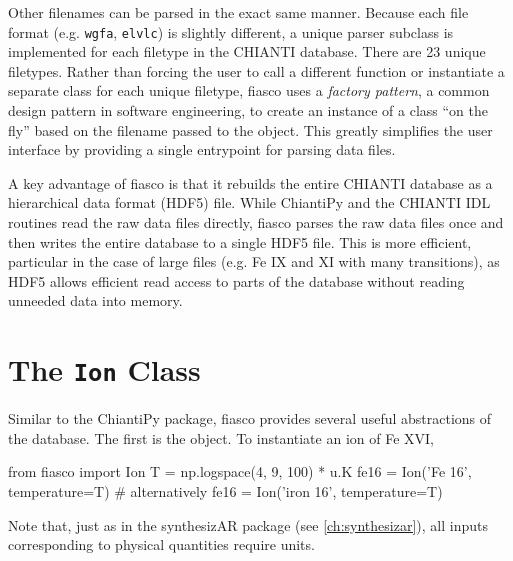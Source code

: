 Other filenames can be parsed in the exact same manner. Because each file format (e.g. \texttt{wgfa}, \texttt{elvlc}) is slightly different, a unique parser subclass is implemented for each filetype in the CHIANTI database. There are 23 unique filetypes. Rather than forcing the user to call a different function or instantiate a separate class for each unique filetype, fiasco uses a \textit{factory pattern}, a common design pattern in software engineering, to create an instance of a class ``on the fly'' based on the filename passed to the  object. This greatly simplifies the user interface by providing a single entrypoint for parsing data files.

A key advantage of fiasco is that it rebuilds the entire CHIANTI database as a hierarchical data format (HDF5) file. While ChiantiPy and the CHIANTI IDL routines read the raw data files directly, fiasco parses the raw data files once and then writes the entire database to a single HDF5 file. This is more efficient, particular in the case of large files (e.g. Fe IX and XI with many transitions), as HDF5 allows efficient read access to parts of the database without reading unneeded data into memory. 

\section{The \texttt{Ion} Class}\label{sec:fiasco-ion}

Similar to the ChiantiPy package, fiasco provides several useful abstractions of the database. The first is the  object. To instantiate an ion of Fe XVI,
\begin{pyverbatim}[appendix1][baselinestretch=1,xleftmargin=3em]
from fiasco import Ion
T = np.logspace(4, 9, 100) * u.K
fe16 = Ion('Fe 16', temperature=T)
# alternatively
fe16 = Ion('iron 16', temperature=T)
\end{pyverbatim}
Note that, just as in the synthesizAR package (see \autoref{ch:synthesizar}), all inputs corresponding to physical quantities require units.

